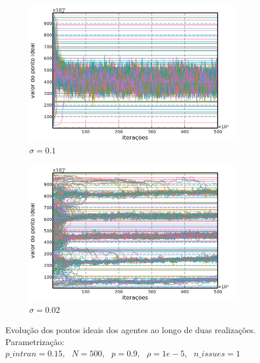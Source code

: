 \begin{figure}[H]
    \centering
    \begin{subfigure}[b]{0.49\textwidth}
      \includegraphics[width=\textwidth]{ims/timeseries3.png}
      \caption{\( \sigma = 0.1\) }
    \end{subfigure}
    \begin{subfigure}[b]{0.49\textwidth}
      \includegraphics[width=\textwidth]{ims/timeseries4.png}
       \caption{\(\sigma = 0.02\) }
      \end{subfigure}
      \caption{Evolução dos pontos ideais dos agentes ao longo de duas realizações.
        Parametrização: \(p\_intran = 0.15, \text{ } N = 500,  \text{ }   p =
        0.9,  \text{ }  \rho = 1e-5,  \text{ }  n\_issues = 1 \)}
      \label{fig:tseries2}
    \end{figure}
    
